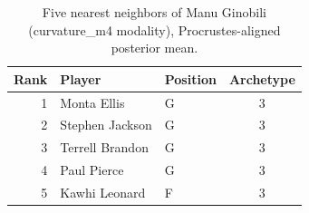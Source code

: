 \begin{table}[htbp]
  \centering\small
  \begin{tabular}{rllc}
    \toprule
    Rank & Player & Position & Archetype \\
    \midrule
    1 & Monta Ellis & G & 3 \\
    2 & Stephen Jackson & G & 3 \\
    3 & Terrell Brandon & G & 3 \\
    4 & Paul Pierce & G & 3 \\
    5 & Kawhi Leonard & F & 3 \\
    \bottomrule
  \end{tabular}
  \caption{Five nearest neighbors of Manu Ginobili (curvature_m4 modality), Procrustes-aligned posterior mean.}
  \label{tab:Manu_Ginobili_neighbors_curvature_m4}
\end{table}

